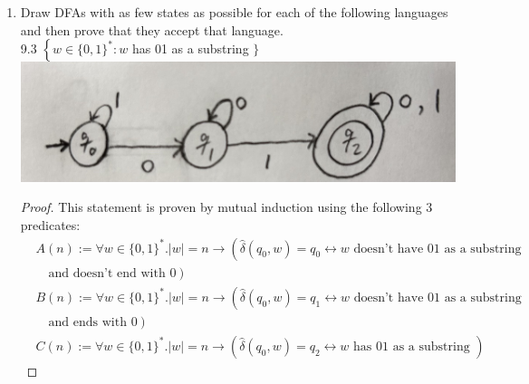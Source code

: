 \documentclass[10pt]{article}
\begin{document}
\begin{enumerate}[label={}]
\begin{proof}
$$\begin{aligned}
                      F(n+2)=F(n+1)+F(n) & \geq F(n+1)+\frac{3}{5} \cdot F(n+1) =1.6 \cdot F(n+1) \quad[\text { math }].
                  \end{aligned}
              $$
              Observe that $1.6 \cdot F(n+1) \geq 1.5 \cdot F(n+1)$.\\
              Therefore,
              $$
                  \begin{aligned}
                      F(n+2) \geq 1.6 \cdot F(n+1) \geq 1.5 \cdot F(n+1) & \quad {\left[\text {math}\right] }. \\
                  \end{aligned}
              $$
              Thus, $P(n+1)$ holds.

              \textbf{Conclusion:} Thus, by strong induction, we can conclude that $F(n+1) \geq 1.5 \cdot F(n)$ for all $n \geq 2$.
          \end{proof}


    \item Draw DFAs with as few states as possible for each of the following languages and then prove that they accept that language.\\

          9.3 $\left\{w \in\{0,1\}^*: w\right.$ has 01 as a substring $\}$\\
          \includegraphics[scale=0.1]{9.3}
          \begin{proof}
              This statement is proven by mutual induction using the following 3 predicates:\\
              $$
                  \begin{aligned}
                       & A(n):=\forall w \in\{0,1\}^* .|w|=n \rightarrow\left(\hat{\delta}\left(q_0, w\right)=q_0 \leftrightarrow w \text { doesn't have 01 as a substring} \right. \\
                       & \quad \left. \text{and doesn't end with } 0\right)                                                                                                         \\
                       & B(n):=\forall w \in\{0,1\}^* .|w|=n \rightarrow\left(\hat{\delta}\left(q_0, w\right)=q_1 \leftrightarrow w \text { doesn't have 01 as a substring} \right. \\
                       & \quad \left. \text{and ends with } 0\right)                                                                                                                \\
                       & C(n):=\forall w \in\{0,1\}^* .|w|=n \rightarrow\left(\hat{\delta}\left(q_0, w\right)=q_2 \leftrightarrow w \text { has 01 as a substring }\right)
                  \end{aligned}
              $$


\end{proof}
\end{enumerate}
\end{document}
